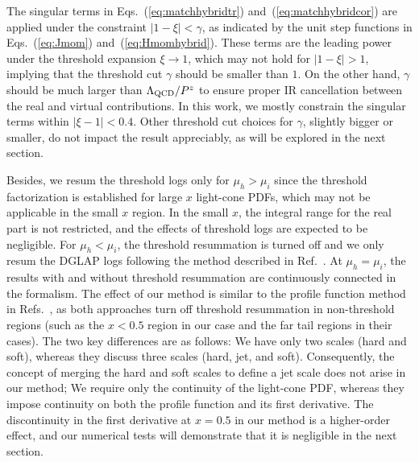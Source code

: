 \documentclass[a4paper,11pt]{article}
\begin{document}
The singular terms in Eqs.~(\ref{eq:matchhybridtr}) and~(\ref{eq:matchhybridcor}) are applied under the constraint $|1-\xi| < \gamma$, as indicated by the unit step functions in Eqs.~(\ref{eq:Jmom}) and~(\ref{eq:Hmomhybrid}). These terms are the leading power under the threshold expansion $\xi \rightarrow 1$, which may not hold for $|1-\xi| > 1$, implying that the threshold cut $\gamma$ should be smaller than $1$. On the other hand, $\gamma$ should be much larger than $\Lambda_{\rm QCD}/P^z$ to ensure proper IR cancellation between the real and virtual contributions. In this work, we mostly constrain the singular terms within $|\xi-1| < 0.4$. Other threshold cut choices for $\gamma$, slightly bigger or smaller, do not impact the result appreciably, as will be explored in the next section. 

Besides, we resum the threshold logs only for $\mu_h > \mu_i$ since the threshold factorization is established for large $x$ light-cone PDFs, which may not be applicable in the small $x$ region. In the small $x$, the integral range for the real part is not restricted, and the effects of threshold logs are expected to be negligible. For $\mu_h < \mu_i$, the threshold resummation is turned off and we only resum the DGLAP logs following the method described in Ref.~\cite{Su:2022fiu}. At $\mu_h=\mu_i$, the results with and without threshold resummation are continuously connected in the formalism. The effect of our method is similar to the profile function method in Refs.~\cite{Abbate:2010xh,Hoang:2014wka}, as both approaches turn off threshold resummation in non-threshold regions (such as the $x < 0.5$ region in our case and the far tail regions in their cases). 
The two key differences are as follows: 
We have only two scales (hard and soft), whereas they discuss three scales (hard, jet, and soft). Consequently, the concept of merging the hard and soft scales to define a jet scale does not arise in our method; 
We require only the continuity of the light-cone PDF, whereas they impose continuity on both the profile function and its first derivative. The discontinuity in the first derivative at $x = 0.5$ in our method is a higher-order effect, and our numerical tests will demonstrate that it is negligible in the next section. 
\end{document}
